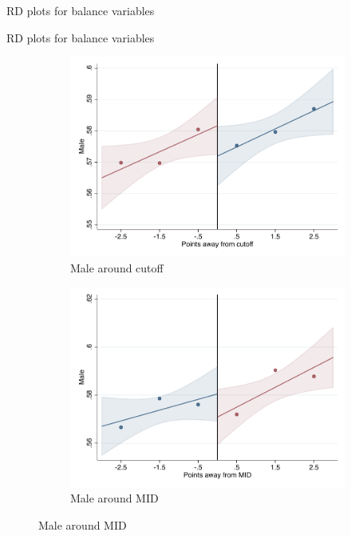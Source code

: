 \documentclass[notes,11pt, aspectratio=169]{beamer}
\begin{document}
\begin{frame}[label=balance_rd_plot_app]{RD plots for balance variables}
\begin{figure}
\end{figure}
\end{frame}

\begin{frame}{RD plots for balance variables}
\hyperlink{balance_rd_plot}{}
\begin{figure}

    \begin{subfigure}{0.45\textwidth}
        \centering
        \caption{Male around cutoff}
        \includegraphics[width=\textwidth]{04_Figures/rd_plot_tau_hombre_IPN3.pdf}
    \end{subfigure}
    \begin{subfigure}{0.45\textwidth}
        \centering
        \caption{Male around MID}
        \includegraphics[width=\textwidth]{04_Figures/rd_plot_mid_hombre_IPN3.pdf}
    \end{subfigure}
    
\end{figure}
\end{frame}
\end{document}
